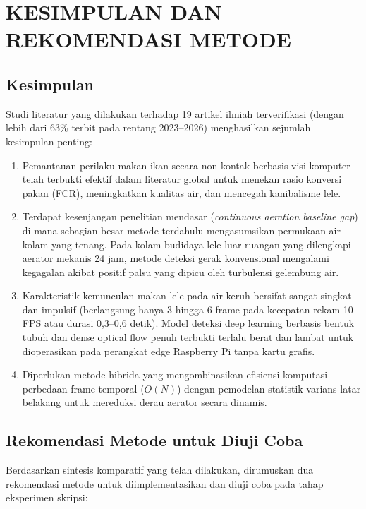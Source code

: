 \section{KESIMPULAN DAN REKOMENDASI METODE}
\label{sec:kesimpulan}

\subsection{Kesimpulan}
Studi literatur yang dilakukan terhadap 19 artikel ilmiah terverifikasi (dengan lebih dari 63\% terbit pada rentang 2023--2026) menghasilkan sejumlah kesimpulan penting:
\begin{enumerate}
    \item Pemantauan perilaku makan ikan secara non-kontak berbasis visi komputer telah terbukti efektif dalam literatur global untuk menekan rasio konversi pakan (FCR), meningkatkan kualitas air, dan mencegah kanibalisme lele.
    \item Terdapat kesenjangan penelitian mendasar (\textit{continuous aeration baseline gap}) di mana sebagian besar metode terdahulu mengasumsikan permukaan air kolam yang tenang. Pada kolam budidaya lele luar ruangan yang dilengkapi aerator mekanis 24 jam, metode deteksi gerak konvensional mengalami kegagalan akibat positif palsu yang dipicu oleh turbulensi gelembung air.
    \item Karakteristik kemunculan makan lele pada air keruh bersifat sangat singkat dan impulsif (berlangsung hanya 3 hingga 6 frame pada kecepatan rekam 10 FPS atau durasi 0,3--0,6 detik). Model deteksi deep learning berbasis bentuk tubuh dan dense optical flow penuh terbukti terlalu berat dan lambat untuk dioperasikan pada perangkat edge Raspberry Pi tanpa kartu grafis.
    \item Diperlukan metode hibrida yang mengombinasikan efisiensi komputasi perbedaan frame temporal ($O(N)$) dengan pemodelan statistik varians latar belakang untuk mereduksi derau aerator secara dinamis.
\end{enumerate}

\subsection{Rekomendasi Metode untuk Diuji Coba}
Berdasarkan sintesis komparatif yang telah dilakukan, dirumuskan dua rekomendasi metode untuk diimplementasikan dan diuji coba pada tahap eksperimen skripsi:

